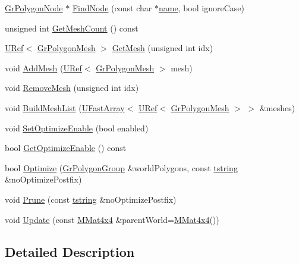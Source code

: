 \begin{CompactItemize}
\item 
\hyperlink{class_gr_polygon_node}{GrPolygonNode} $\ast$ \hyperlink{class_gr_polygon_node_cd3a36f25dcfa15dc007a2ac2c7c13d5}{FindNode} (const char $\ast$\hyperlink{glext__bak_8h_bb62efe59ccdd153ce42e1a418352209}{name}, bool ignoreCase)
\item 
unsigned int \hyperlink{class_gr_polygon_node_410f7e5c06508726df3f19bfe2754473}{GetMeshCount} () const 
\item 
\hyperlink{class_u_ref}{URef}$<$ \hyperlink{class_gr_polygon_mesh}{GrPolygonMesh} $>$ \hyperlink{class_gr_polygon_node_9c47d84b59e6f24aeae3879895db0ff9}{GetMesh} (unsigned int idx)
\item 
void \hyperlink{class_gr_polygon_node_b75318e7bef982eced7f960f10df8bb9}{AddMesh} (\hyperlink{class_u_ref}{URef}$<$ \hyperlink{class_gr_polygon_mesh}{GrPolygonMesh} $>$ mesh)
\item 
void \hyperlink{class_gr_polygon_node_60a8d0b1e0d13e8801e73abda8a3ce58}{RemoveMesh} (unsigned int idx)
\item 
void \hyperlink{class_gr_polygon_node_3391bb965d15d459bbc12888f7ced8b6}{BuildMeshList} (\hyperlink{class_u_fast_array}{UFastArray}$<$ \hyperlink{class_u_ref}{URef}$<$ \hyperlink{class_gr_polygon_mesh}{GrPolygonMesh} $>$ $>$ \&meshes)
\item 
void \hyperlink{class_gr_polygon_node_df9325ab5b72b5a3723e921c2c0d22f0}{SetOptimizeEnable} (bool enabled)
\item 
bool \hyperlink{class_gr_polygon_node_b6c5f43907f4c5fc89ce5cb62df76538}{GetOptimizeEnable} () const 
\item 
bool \hyperlink{class_gr_polygon_node_742f1c54d6865a59163e541fb4e84483}{Optimize} (\hyperlink{class_gr_polygon_group}{GrPolygonGroup} \&worldPolygons, const \hyperlink{common__afx_8h_816fa58fd77499b0edb2c69ebe803d5c}{tstring} \&noOptimizePostfix)
\item 
void \hyperlink{class_gr_polygon_node_8719d2c19a3d078a1c8e6928c4c691e9}{Prune} (const \hyperlink{common__afx_8h_816fa58fd77499b0edb2c69ebe803d5c}{tstring} \&noOptimizePostfix)
\item 
void \hyperlink{class_gr_polygon_node_bbc436bb38dbce862723044ca910b08a}{Update} (const \hyperlink{class_m_mat4x4}{MMat4x4} \&parentWorld=\hyperlink{class_m_mat4x4}{MMat4x4}())
\end{CompactItemize}


\subsection{Detailed Description}


